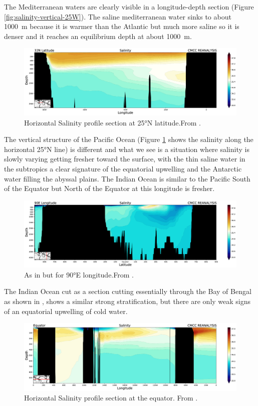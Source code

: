 The Mediterranean waters are clearly visible in a longitude-depth
section (Figure \ref{fig:salinity-vertical-25W}). The saline mediterranean water sinks
to about \qty{1000}{\meter} because it is warmer than the Atlantic but much more
saline so it is denser and it reaches an equilibrium depth at about
\qty{1000}{\meter}.

\begin{figure}
	\centering
	\includegraphics[width=0.7\linewidth]{figs/salinity-vertical-25N}
	\caption{Horizontal Salinity profile section at \ang{25}N latitude.From \CMCCreanalysis.}
	\label{fig:salinity-horizontal-25N}
\end{figure}

The vertical structure of the Pacific Ocean (Figure \ref{fig:salinity-horizontal-25N} shows the salinity along the horizontal
\ang{25}N line) is
different and what we see is a situation where salinity is slowly
varying getting fresher toward the surface, with the thin saline water
in the subtropics a clear signature of the equatorial upwelling and the
Antarctic water filling the abyssal plains. The Indian Ocean is similar
to the Pacific South of the Equator but North of the Equator at this
longitude is fresher.

\begin{figure}
	\centering
	\includegraphics[width = 0.7 \textwidth]{figs/salinity-vertical-90E}
	\caption{As in \fig{\ref{fig:salinity-horizontal-25N}} but for \ang{90}E longitude.From \CMCCreanalysis.}
	\label{fig:salinity-vertical-90E}
\end{figure}

The Indian Ocean  cut as a section cutting essentially through the Bay of Bengal as shown in \fig{\ref{fig:salinity-vertical-90E}}, shows a similar strong
stratification, but there are only weak signs of an equatorial upwelling
of cold water.
\begin{figure}
	\centering
	\includegraphics[width = 0.7 \textwidth]{figs/salinity-vertical-equator}
	\caption{Horizontal Salinity profile section at the equator. From \CMCCreanalysis.}
	\label{fig:salinity-vertical-equator}
\end{figure}

